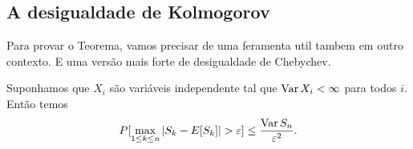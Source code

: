\begin{topics}
\begin{exercise}
 
 
\end{exercise}

\subsection{A desigualdade de Kolmogorov}

Para provar o Teorema, vamos precisar de uma feramenta util tambem em outro contexto.
E uma versão mais forte de desigualdade de Chebychev.

\medskip


\begin{theorem}
Suponhamos que $X_i$ são variáveis independente tal que $\operatorname{Var} X_i<\infty$ para todos $i$. 
Então temos
\begin{equation}
 P[\max_{1\le k\le n} |S_k-E[S_k]|>\gep ]\le  \frac{\Var S_n}{\gep^2}.
\end{equation}

\end{theorem}



\end{topics}
